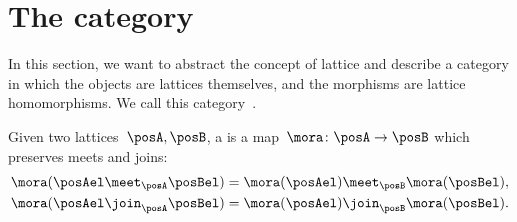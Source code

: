 \section[The category \Lat]{The category~\Lat}
In this section, we want to abstract the concept of lattice and describe a category in which the objects are lattices themselves, and the morphisms are lattice homomorphisms.
We call this category~\Lat.

\begin{ctdefinition}
	\label{def:lattice_homomorphism}
	Given two lattices~$\posA, \posB$, a \emph{} is a map~$\mora\colon \posA\to \posB$ which preserves meets and joins:
	\begin{equation}
		\begin{aligned}
			\mora(\posAel \meet_\posA \posBel) & = \mora(\posAel) \meet_\posB \mora(\posBel),  \\
			\mora(\posAel \join_\posA \posBel) & = \mora(\posAel) \join_\posB \mora(\posBel).
		\end{aligned}
	\end{equation}
\end{ctdefinition}

